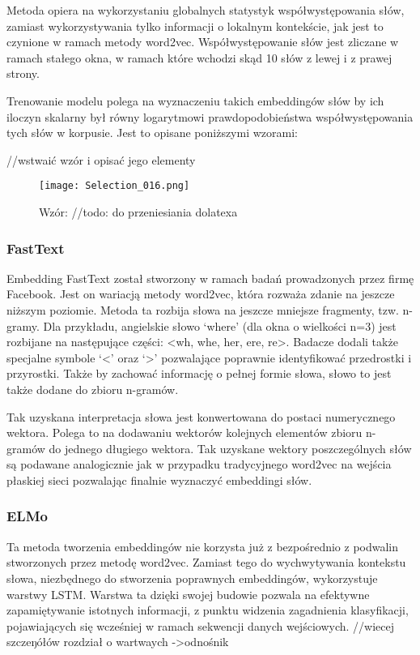 Metoda opiera na wykorzystaniu globalnych statystyk współwystępowania słów, zamiast wykorzystywania tylko informacji o lokalnym kontekście, jak jest to czynione w ramach metody word2vec. Współwystępowanie słów jest zliczane w ramach stałego okna, w ramach które wchodzi skąd 10 słów z lewej i z prawej strony. 

Trenowanie modelu polega na wyznaczeniu takich embeddingów słów by ich iloczyn skalarny był równy logarytmowi prawdopodobieństwa współwystępowania tych słów w korpusie. Jest to opisane poniższymi wzorami: 

//wstwaić wzór i opisać jego elementy 

\begin{figure}[!h]
    \label{fig:wzor}
    \centering \texttt{[image: Selection\_016.png]}
    \caption{Wzór: //todo: do przeniesiania dolatexa}
\end{figure}

\subsubsection{FastText}

Embedding FastText został stworzony w ramach badań prowadzonych przez firmę Facebook. Jest on wariacją metody word2vec, która rozważa zdanie na jeszcze niższym poziomie. Metoda ta rozbija słowa na jeszcze mniejsze fragmenty, tzw. n-gramy. Dla przykładu, angielskie słowo ‘where’ (dla okna o wielkości n=3) jest rozbijane na następujące części: <wh, whe, her, ere, re>. Badacze dodali także specjalne symbole ‘<’ oraz ‘>’ pozwalające poprawnie identyfikować przedrostki i przyrostki. Także by zachować informację o pełnej formie słowa, słowo to jest także dodane do zbioru n-gramów. 

Tak uzyskana interpretacja słowa jest konwertowana do postaci numerycznego wektora. Polega to na dodawaniu wektorów kolejnych elementów zbioru n-gramów do jednego długiego wektora. Tak uzyskane wektory poszczególnych słów są podawane analogicznie jak w przypadku tradycyjnego word2vec na wejścia płaskiej sieci pozwalając finalnie wyznaczyć embeddingi słów. 


\subsubsection{ELMo}

Ta metoda tworzenia embeddingów nie korzysta już z bezpośrednio z podwalin stworzonych przez metodę word2vec. Zamiast tego do wychwytywania kontekstu słowa, niezbędnego do stworzenia poprawnych embeddingów, wykorzystuje warstwy LSTM. Warstwa ta dzięki swojej budowie pozwala na efektywne zapamiętywanie istotnych informacji, z punktu widzenia zagadnienia klasyfikacji, pojawiających się wcześniej w ramach sekwencji danych wejściowych. 
//wiecej szczeŋółów rozdział o wartwaych  ->odnośnik

